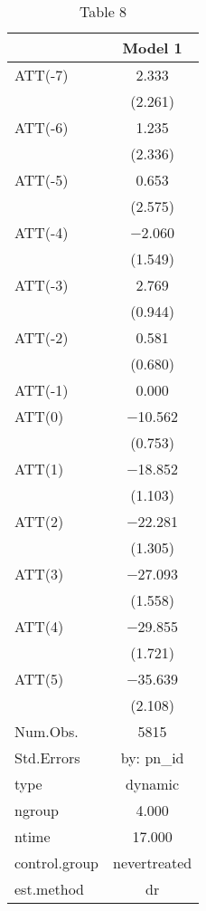 \begin{table}

\caption{\label{tab:write-results}Table 8}
\centering
\begin{tabular}[t]{lc}
\toprule
  & Model 1\\
\midrule
ATT(-7) & \num{2.333}\\
 & (\num{2.261})\\
ATT(-6) & \num{1.235}\\
 & (\num{2.336})\\
ATT(-5) & \num{0.653}\\
 & (\num{2.575})\\
ATT(-4) & \num{-2.060}\\
 & (\num{1.549})\\
ATT(-3) & \num{2.769}\\
 & (\num{0.944})\\
ATT(-2) & \num{0.581}\\
 & (\num{0.680})\\
ATT(-1) & \num{0.000}\\
ATT(0) & \num{-10.562}\\
 & (\num{0.753})\\
ATT(1) & \num{-18.852}\\
 & (\num{1.103})\\
ATT(2) & \num{-22.281}\\
 & (\num{1.305})\\
ATT(3) & \num{-27.093}\\
 & (\num{1.558})\\
ATT(4) & \num{-29.855}\\
 & (\num{1.721})\\
ATT(5) & \num{-35.639}\\
 & (\num{2.108})\\
\midrule
Num.Obs. & \num{5815}\\
Std.Errors & by: pn\_id\\
type & dynamic\\
ngroup & \num{4.000}\\
ntime & \num{17.000}\\
control.group & nevertreated\\
est.method & dr\\
\bottomrule
\end{tabular}
\end{table}
